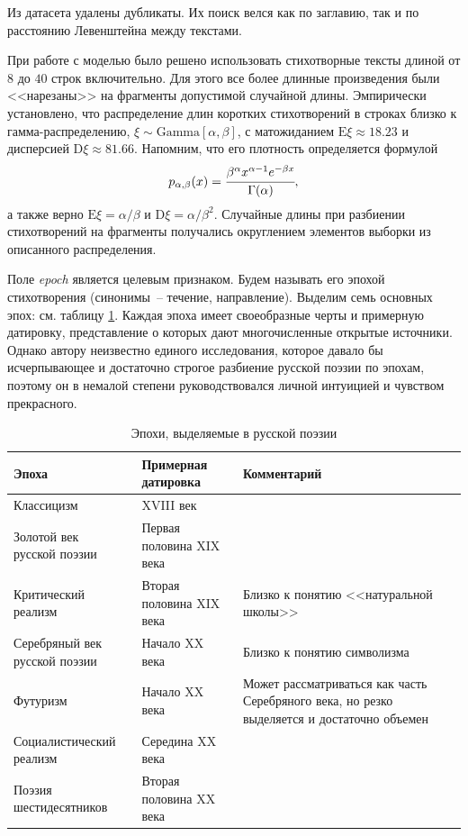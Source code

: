 \documentclass[a4paper,12pt]{article}
\begin{document}
Из датасета удалены дубликаты. Их поиск велся как по заглавию, так и по расстоянию Левенштейна между текстами.

При работе с моделью было решено использовать стихотворные тексты длиной от $8$ до $40$ строк включительно. Для этого все более длинные произведения были <<нарезаны>> на фрагменты допустимой случайной длины. Эмпирически установлено, что распределение длин коротких стихотворений в строках близко к гамма-распределению, $\xi \sim \text{Gamma}[\alpha, \beta]$, с матожиданием $\text{E} \xi \approx 18.23$ и дисперсией $\text{D} \xi \approx 81.66$. Напомним, что его плотность определяется формулой
\[
    p_{\alpha, \beta}(x) = \cfrac{\beta^\alpha x^{\alpha - 1} e^{-\beta x}}{\Gamma(\alpha)},
\]
а также верно $\text{E} \xi = \alpha / \beta$ и $\text{D} \xi = \alpha / \beta^2$. Случайные длины при разбиении стихотворений на фрагменты получались округлением элементов выборки из описанного распределения.

Поле \textit{epoch} является целевым признаком. Будем называть его эпохой стихотворения (синонимы~-- течение, направление). Выделим семь основных эпох: см. таблицу \ref{tab:epoches}. Каждая эпоха имеет своеобразные черты и примерную датировку, представление о которых дают многочисленные открытые источники. Однако автору неизвестно единого исследования, которое давало бы исчерпывающее и достаточно строгое разбиение русской поэзии по эпохам, поэтому он в немалой степени руководствовался личной интуицией и чувством прекрасного.

\begin{table}[t]
\centering
\begin{tabular}[t]{|m{3.4cm}|m{3.6cm}|m{8cm}|}
    \hline
    Эпоха & \makecell[l]{Примерная \\ датировка} & Комментарий \\
    \hline
    \hline
    Классицизм & XVIII век & \\
    \hline
    \makecell[l]{Золотой век \\ русской поэзии} & Первая половина XIX века & \\
    \hline
    \makecell[l]{Критический \\ реализм} & Вторая половина XIX века & Близко к понятию <<натуральной школы>> \\
    \hline
    \makecell[l]{Серебряный век \\ русской поэзии} & Начало XX века & Близко к понятию символизма \\
    \hline
    Футуризм & Начало XX века & Может рассматриваться как часть Серебряного века, но резко выделяется и достаточно объемен \\
    \hline
    Социалистический реализм & Середина XX века & \\
    \hline
    \makecell[l]{Поэзия \\ шестидесятников} & Вторая половина XX века & \\
    \hline
\end{tabular}
\caption{Эпохи, выделяемые в русской поэзии}
\label{tab:epoches}
\end{table}
\end{document}
